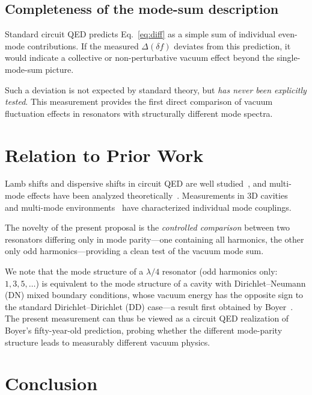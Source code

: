 \documentclass[aps,prl,twocolumn,superscriptaddress,nofootinbib]{revtex4-2}
\begin{document}
\subsection{Completeness of the mode-sum description}

Standard circuit QED predicts Eq.~\eqref{eq:diff} as a simple sum
of individual even-mode contributions.  If the measured
$\Delta(\delta f)$ deviates from this prediction, it would indicate
a collective or non-perturbative vacuum effect beyond the
single-mode-sum picture.

Such a deviation is not expected by standard theory, but
\emph{has never been explicitly tested}.  This measurement provides
the first direct comparison of vacuum fluctuation effects in
resonators with structurally different mode spectra.

\section{Relation to Prior Work}

Lamb shifts and dispersive shifts in circuit QED are well
studied~\cite{Schuster2007,Gambetta2006,Paik2011}, and
multi-mode effects have been analyzed
theoretically~\cite{Nigg2012,Solgun2014}.  Measurements in
3D cavities~\cite{Reagor2016} and multi-mode
environments~\cite{McKay2015} have characterized individual mode
couplings.

The novelty of the present proposal is the \emph{controlled
comparison} between two resonators differing only in mode
parity---one containing all harmonics, the other only odd
harmonics---providing a clean test of the vacuum mode sum.

We note that the mode structure of a $\lambda/4$ resonator
(odd harmonics only: $1, 3, 5, \ldots$) is equivalent to the
mode structure of a cavity with Dirichlet--Neumann (DN) mixed
boundary conditions, whose vacuum energy has the opposite sign
to the standard Dirichlet--Dirichlet (DD) case---a result
first obtained by Boyer~\cite{Boyer1974}.  The present
measurement can thus be viewed as a circuit QED realization
of Boyer's fifty-year-old prediction, probing whether the
different mode-parity structure leads to measurably different
vacuum physics.

\section{Conclusion}
\end{document}
